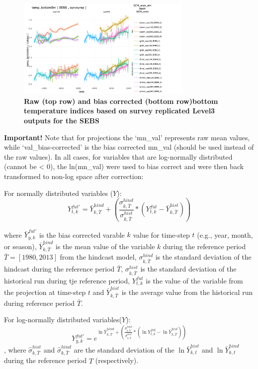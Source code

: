 \documentclass[
]{article}
\begin{document}
\begin{figure}
\centering
\includegraphics[width=0.75\textwidth,height=\textheight]{Figs/biascorrected_temp2.png}
\caption{\textbf{Raw (top row) and bias corrected (bottom row)bottom
temperature indices based on survey replicated Level3 outputs for the
SEBS}}
\end{figure}

\textbf{Important!} Note that for projections the `mn\_val' represents
raw mean values, while `val\_bias-corrected' is the bias corrected
mn\_val (should be used instead of the raw values). In all cases, for
variables that are log-normally distributed (cannot be \textless{} 0),
the ln(mn\_val) were used to bias correct and were then back transformed
to non-log space after correction:

For normally distributed variables (\(Y\)):
\[{Y}^{fut'}_{t,k} =\bar{Y}^{hind}_{k,\bar{T}} +\left( \frac{\sigma^{hind}_{k,\bar{T}}}{\sigma^{hist}_{k,\bar{T}}}*({Y}^{fut}_{t,k}-\bar{Y}^{hist}_{k,\bar{T}})  \right )\]

where \(\bar{Y}^{fut'}_{y,k}\) is the bias corrected varable \(k\) value
for time-step \(t\) (e.g., year, month, or season),
\(\bar{Y}^{hind}_{k,\bar{T}}\) is the mean value of the variable \(k\)
during the reference period \(\bar{T}=[1980,2013]\) from the hindcast
model, \(\sigma^{hind}_{k,\bar{T}}\) is the standard deviation of the
hindcast during the reference period \(\bar{T}\),
\(\sigma^{hist}_{k,\bar{T}}\) is the standard deviation of the
historical run during tje reference period, \({Y}^{fut}_{t,k}\) is the
value of the variable from the projection at time-step \(t\) and
\(\bar{Y}^{hist}_{k,\bar{T}}\) is the average value from the historical
run during reference period \(\bar{T}\).

For log-normally distributed variables(\(Y\)):
\[{Y}^{fut'}_{y,k} =e^{\ln\bar{Y}^{hind}_{k,\bar{T}} +\left( \frac{\hat{\sigma}^{hind}_{k,\bar{T}}}{\hat{\sigma}^{hist}_{k,\bar{T}}}*(\ln{Y}^{fut}_{t,k}-\ln\bar{Y}^{hist}_{k,\bar{T}})  \right )}\],
where \(\hat\sigma^{hist}_{k,\bar{T}}\) and
\(\hat\sigma^{hind}_{k,\bar{T}}\) are the standard deviation of the
\(\ln\bar{Y}^{hist}_{k,t}\) and \(\ln\bar{Y}^{hind}_{k,t}\) during the
reference period \(\hat{T}\) (respectively).
\end{document}
